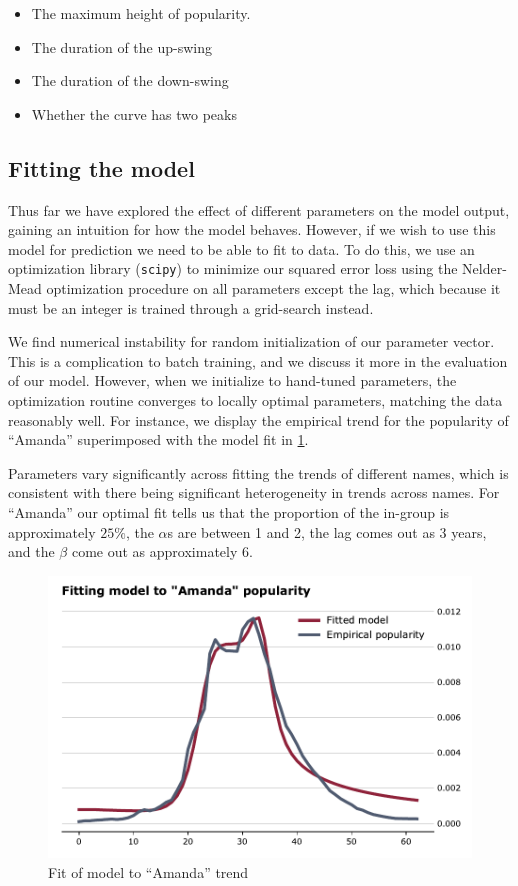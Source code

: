 \documentclass[a4paper]{article}
\begin{document}
\begin{itemize}
\item The maximum height of popularity.
\item The duration of the up-swing
\item The duration of the down-swing
\item Whether the curve has two peaks
\end{itemize}

\subsection{Fitting the model}

Thus far we have explored the effect of different parameters on the model
output, gaining an intuition for how the model behaves. However, if we wish to
use this model for prediction we need to be able to fit to data. To do this, we
use an optimization library (\texttt{scipy}) to minimize our squared error loss
using the Nelder-Mead optimization procedure on all parameters except the lag,
which because it must be an integer is trained through a grid-search instead.

We find numerical instability for random initialization of our parameter vector.
This is a complication to batch training, and we discuss it more in the
evaluation of our model. However, when we initialize to hand-tuned parameters,
the optimization routine converges to locally optimal parameters, matching the
data reasonably well. For instance, we display the empirical trend for the
popularity of ``Amanda'' superimposed with the model fit in
\cref{fig:amanda-segmented}.

Parameters vary significantly across fitting the trends of different names,
which is consistent with there being significant heterogeneity in trends across
names. For ``Amanda'' our optimal fit tells us that the proportion of the
in-group is approximately $25\%$, the $\alpha$s are between 1 and 2, the lag
comes out as 3 years, and the $\beta$ come out as approximately 6.

\begin{figure}[h]
\centering
\includegraphics[width=.9\textwidth]{figs/amanda-fit.pdf}
\caption{Fit of model to ``Amanda'' trend}
\label{fig:amanda-segmented}
\end{figure}
\end{document}
